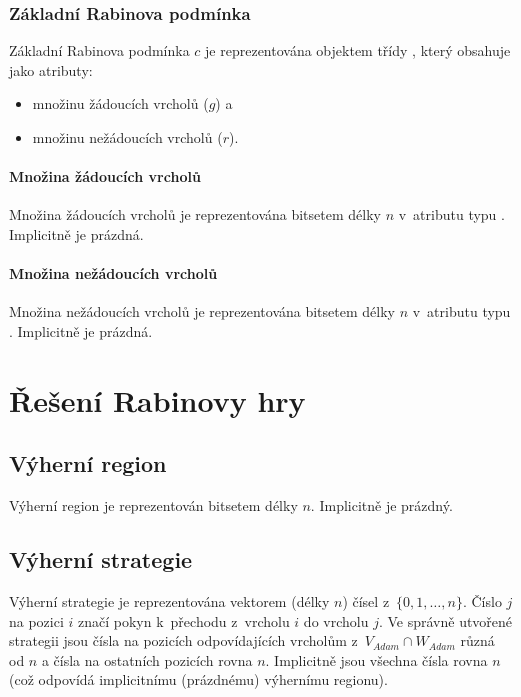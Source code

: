 \subsubsection{Základní Rabinova podmínka}
Základní Rabinova podmínka $c$ je reprezentována objektem třídy , který obsahuje jako atributy:
\begin{itemize}
\item množinu žádoucích vrcholů ($g$) a
\item množinu nežádoucích vrcholů ($r$).
\end{itemize}
\paragraph{Množina žádoucích vrcholů}
Množina žádoucích vrcholů je reprezentována bitsetem délky $n$ v~atributu  typu . Implicitně je prázdná.
\paragraph{Množina nežádoucích vrcholů}
Množina nežádoucích vrcholů je reprezentována bitsetem délky $n$ v~atributu  typu . Implicitně je prázdná.
\section{Řešení Rabinovy hry}
\subsection{Výherní region}
Výherní region je reprezentován bitsetem délky $n$. Implicitně je prázdný.
\subsection{Výherní strategie}
Výherní strategie je reprezentována vektorem (délky $n$) čísel z~$\{0, 1, \dotsc, n\}$. Číslo $j$ na pozici $i$ značí pokyn k~přechodu z~vrcholu $i$ do vrcholu $j$. Ve správně utvořené strategii jsou čísla na pozicích odpovídajících vrcholům z~$V_{Adam} \cap W_{Adam}$ různá od $n$ a čísla na ostatních pozicích rovna $n$. Implicitně jsou všechna čísla rovna $n$ (což odpovídá implicitnímu (prázdnému) výhernímu regionu).